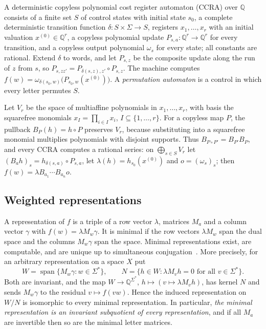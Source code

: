 \documentclass[acmlarge,screen,11pt,nonacm,natbib=false]{acmart}
\newcommand{\Q}{\mathbb{Q}}
\newcommand{\spn}{\operatorname{span}}
\theoremstyle{definition}
\begin{document}
A deterministic copyless polynomial cost register automaton (CCRA) over $\Q$ consists of a finite set $S$ of control states with initial state $s_0$, a complete deterministic transition function $\delta:S\times\Sigma\to S$, registers $x_1,\ldots,x_r$ with an initial valuation $x^{(0)}\in\Q^r$, a copyless polynomial update $P_{s,a}:\Q^r\to\Q^r$ for every transition, and a copyless output polynomial $\omega_s$ for every state; all constants are rational. Extend $\delta$ to words, and let $P_{s,z}$ be the composite update along the run of $z$ from $s$, so $P_{s,zz'}=P_{\delta(s,z),z'}\circ P_{s,z}$. The machine computes $f(w)=\omega_{\delta(s_0,w)}\bigl(P_{s_0,w}(x^{(0)})\bigr)$. A \emph{permutation automaton} is a control in which every letter permutes $S$.

Let $V_r$ be the space of multiaffine polynomials in $x_1,\ldots,x_r$, with basis the squarefree monomials $x_I=\prod_{i\in I}x_i$, $I\subseteq\{1,\ldots,r\}$. For a copyless map $P$, the pullback $B_P(h)=h\circ P$ preserves $V_r$, because substituting into a squarefree monomial multiplies polynomials with disjoint supports. Thus $B_{P\circ P'}=B_{P'}B_P$, and every CCRA computes a rational series: on $\bigoplus_{s\in S}V_r$ let $(B_ah)_s=h_{\delta(s,a)}\circ P_{s,a}$, let $\lambda(h)=h_{s_0}(x^{(0)})$ and $o=(\omega_s)_s$; then $f(w)=\lambda B_{a_1}\cdots B_{a_n}o$.

\subsection{Weighted representations}
A representation of $f$ is a triple of a row vector $\lambda$, matrices $M_a$ and a column vector $\gamma$ with $f(w)=\lambda M_w\gamma$. It is minimal if the row vectors $\lambda M_w$ span the dual space and the columns $M_w\gamma$ span the space. Minimal representations exist, are computable, and are unique up to simultaneous conjugation~\cite{Sch61,BR11}. More precisely, for an arbitrary representation on a space $X$ put
\begin{equation}\label{eq:WN}
W=\spn\{M_w\gamma:w\in\Sigma^*\},\qquad N=\{h\in W:\lambda M_vh=0\text{ for all }v\in\Sigma^*\}.
\end{equation}
Both are invariant, and the map $W\to\Q^{\Sigma^*}$, $h\mapsto(v\mapsto\lambda M_vh)$, has kernel $N$ and sends $M_w\gamma$ to the residual $v\mapsto f(vw)$. Hence the induced representation on $W/N$ is isomorphic to every minimal representation. In particular, \emph{the minimal representation is an invariant subquotient of every representation}, and if all $M_a$ are invertible then so are the minimal letter matrices.
\end{document}
